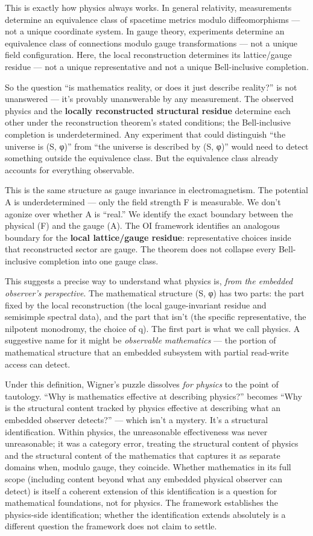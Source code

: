 \documentclass[
]{article}
\begin{document}
This is exactly how physics always works. In general relativity,
measurements determine an equivalence class of spacetime metrics modulo
diffeomorphisms --- not a unique coordinate system. In gauge theory,
experiments determine an equivalence class of connections modulo gauge
transformations --- not a unique field configuration. Here, the local
reconstruction determines its lattice/gauge residue --- not a unique
representative and not a unique Bell-inclusive completion.

So the question ``is mathematics reality, or does it just describe
reality?'' is not unanswered --- it's provably unanswerable by any
measurement. The observed physics and the \textbf{locally reconstructed
structural residue} determine each other under the reconstruction
theorem's stated conditions; the Bell-inclusive completion is
underdetermined. Any experiment that could distinguish ``the universe is
(S, φ)'' from ``the universe is described by (S, φ)'' would need to
detect something outside the equivalence class. But the equivalence
class already accounts for everything observable.

This is the same structure as gauge invariance in electromagnetism. The
potential A is underdetermined --- only the field strength F is
measurable. We don't agonize over whether A is ``real.'' We identify the
exact boundary between the physical (F) and the gauge (A). The OI
framework identifies an analogous boundary for the \textbf{local
lattice/gauge residue}: representative choices inside that reconstructed
sector are gauge. The theorem does not collapse every Bell-inclusive
completion into one gauge class.

This suggests a precise way to understand what physics is, \emph{from
the embedded observer's perspective}. The mathematical structure (S, φ)
has two parts: the part fixed by the local reconstruction (the local
gauge-invariant residue and semisimple spectral data), and the part that
isn't (the specific representative, the nilpotent monodromy, the choice
of q). The first part is what we call physics. A suggestive name for it
might be \emph{observable mathematics} --- the portion of mathematical
structure that an embedded subsystem with partial read-write access can
detect.

Under this definition, Wigner's puzzle dissolves \emph{for physics} to
the point of tautology. ``Why is mathematics effective at describing
physics?'' becomes ``Why is the structural content tracked by physics
effective at describing what an embedded observer detects?'' --- which
isn't a mystery. It's a structural identification. Within physics, the
unreasonable effectiveness was never unreasonable; it was a category
error, treating the structural content of physics and the structural
content of the mathematics that captures it as separate domains when,
modulo gauge, they coincide. Whether mathematics in its full scope
(including content beyond what any embedded physical observer can
detect) is itself a coherent extension of this identification is a
question for mathematical foundations, not for physics. The framework
establishes the physics-side identification; whether the identification
extends absolutely is a different question the framework does not claim
to settle.
\end{document}
